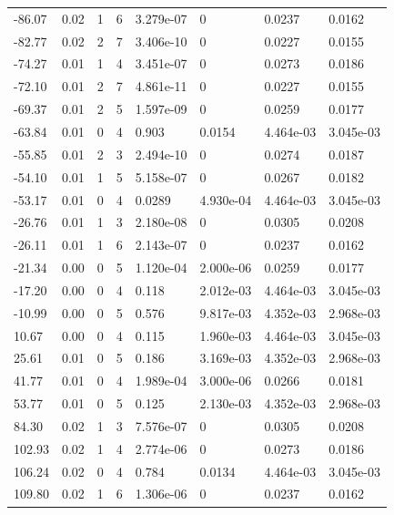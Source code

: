 \documentclass[preview]{standalone}
\begin{document}
{{\begin{tabular}{L{1.2cm}C{1.2cm} C{0.3cm}C{0.5cm} C{1.4cm}C{1.4cm} C{1.4cm}C{1.4cm}}
  -86.07  &  0.02  & 1     &  6 &  3.279e-07  & 0  & 0.0237 &  0.0162   \\ 
  -82.77  &  0.02  & 2     &  7 &  3.406e-10  & 0  & 0.0227 &  0.0155   \\ 
  -74.27  &  0.01  & 1     &  4 &  3.451e-07  & 0  & 0.0273 &  0.0186   \\ 
  -72.10  &  0.01  & 2     &  7 &  4.861e-11  & 0  & 0.0227 &  0.0155   \\ 
  -69.37  &  0.01  & 2     &  5 &  1.597e-09  & 0  & 0.0259 &  0.0177   \\ 
  -63.84  &  0.01  & 0     &  4 &  0.903  & 0.0154  & 4.464e-03 &  3.045e-03   \\ 
  -55.85  &  0.01  & 2     &  3 &  2.494e-10  & 0  & 0.0274 &  0.0187   \\ 
  -54.10  &  0.01  & 1     &  5 &  5.158e-07  & 0  & 0.0267 &  0.0182   \\ 
  -53.17  &  0.01  & 0     &  4 &  0.0289  & 4.930e-04  & 4.464e-03 &  3.045e-03   \\ 
  -26.76  &  0.01  & 1     &  3 &  2.180e-08  & 0  & 0.0305 &  0.0208   \\ 
  -26.11  &  0.01  & 1     &  6 &  2.143e-07  & 0  & 0.0237 &  0.0162   \\ 
  -21.34  &  0.00  & 0     &  5 &  1.120e-04  & 2.000e-06  & 0.0259 &  0.0177   \\ 
  -17.20  &  0.00  & 0     &  4 &  0.118  & 2.012e-03  & 4.464e-03 &  3.045e-03   \\ 
  -10.99  &  0.00  & 0     &  5 &  0.576  & 9.817e-03  & 4.352e-03 &  2.968e-03   \\ 
  10.67  &  0.00  & 0     &  4 &  0.115  & 1.960e-03  & 4.464e-03 &  3.045e-03   \\ 
  25.61  &  0.01  & 0     &  5 &  0.186  & 3.169e-03  & 4.352e-03 &  2.968e-03   \\ 
  41.77  &  0.01  & 0     &  4 &  1.989e-04  & 3.000e-06  & 0.0266 &  0.0181   \\ 
  53.77  &  0.01  & 0     &  5 &  0.125  & 2.130e-03  & 4.352e-03 &  2.968e-03   \\ 
  84.30  &  0.02  & 1     &  3 &  7.576e-07  & 0  & 0.0305 &  0.0208   \\ 
  102.93  &  0.02  & 1     &  4 &  2.774e-06  & 0  & 0.0273 &  0.0186   \\ 
  106.24  &  0.02  & 0     &  4 &  0.784  & 0.0134  & 4.464e-03 &  3.045e-03   \\ 
  109.80  &  0.02  & 1     &  6 &  1.306e-06  & 0  & 0.0237 &  0.0162   \\ 

\end{tabular}}}
\end{document}
